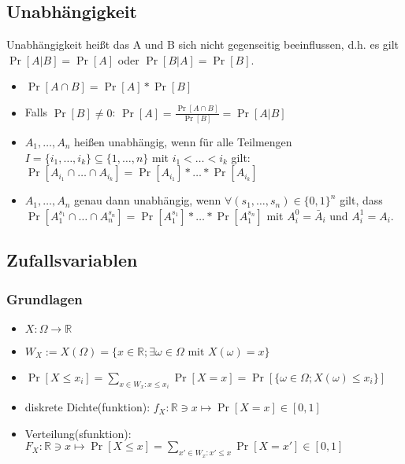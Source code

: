 \subsection{Unabhängigkeit}
Unabhängigkeit heißt das A und B sich nicht gegenseitig beeinflussen, d.h. es gilt $\Pr[A|B]=\Pr[A]$ oder $\Pr[B|A]=\Pr[B]$.

\begin{itemize}
\item $\Pr[A\cap B]=\Pr[A]*\Pr[B]$
\item Falls $\Pr[B]\neq0$: $\Pr[A]=\frac{\Pr[A\cap B]}{\Pr[B]}=\Pr[A|B]$
\item $A_1,\ldots,A_n$ heißen unabhängig, wenn für alle Teilmengen $I = \{ i_1,\ldots, i_k\}\subseteq\{1,\ldots,n\}$ mit $i_1<\ldots<i_k$ gilt:\\
	$\Pr[A_{i_1}\cap\ldots\cap A_{i_k}]=\Pr[A_{i_1}]*\ldots*\Pr[A_{i_k}]$
\item $A_1,\ldots,A_n$ genau dann unabhängig, wenn $\forall (s_1,\ldots,s_n)\in\{0,1\}^n$ gilt, dass\\
	$\Pr[A_1^{s_1}\cap\ldots\cap A_n^{s_n}]=\Pr[A_1^{s_1}]*\ldots*\Pr[A_1^{s_n}]$ mit $A_i^0=\bar A_i$ und $A_i^1=A_i$.
\end{itemize}

\subsection{Zufallsvariablen}

\subsubsection{Grundlagen}
\begin{itemize}
\item $X:\Omega\rightarrow\mathbb{R}$
\item $W_X:=X(\Omega)=\{x\in\mathbb{R};\exists\omega\in\Omega\text{ mit } X(\omega)=x\}$
\item $\Pr[X\leq x_i]=\sum_{x\in W_x:x\leq x_i}\Pr[X=x]=\Pr[\{\omega\in\Omega ;X(\omega)\leq x_i\}]$
\item diskrete Dichte(funktion): $f_{X}:\mathbb{R}\ni x\mapsto\Pr[X=x]\in[0,1]$
\item Verteilung(sfunktion): $F_X:\mathbb{R}\ni x\mapsto\Pr[X\leq x]=\sum_{x'\in W_x:x'\leq x}\Pr[X=x']\in[0,1]$
\end{itemize}


